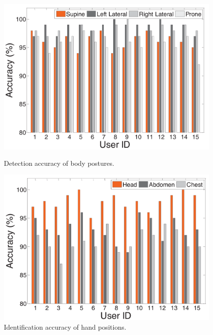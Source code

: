 \begin{figure}
	\centering
	\begin{minipage}{.5\textwidth}
	 \centering
	\includegraphics[width=0.95\linewidth]{Figures/posture_zhu.pdf}
	\caption{Detection accuracy of body postures.}\label{fig:posture_zhu}
	\end{minipage}%
	\begin{minipage}{.5\textwidth}
			\centering
		\includegraphics[width=0.95\linewidth]{Figures/handposition_zhu.pdf}
		\caption{Identification accuracy of hand positions.}\label{fig:hand_zhu}
	\end{minipage}
\end{figure}


